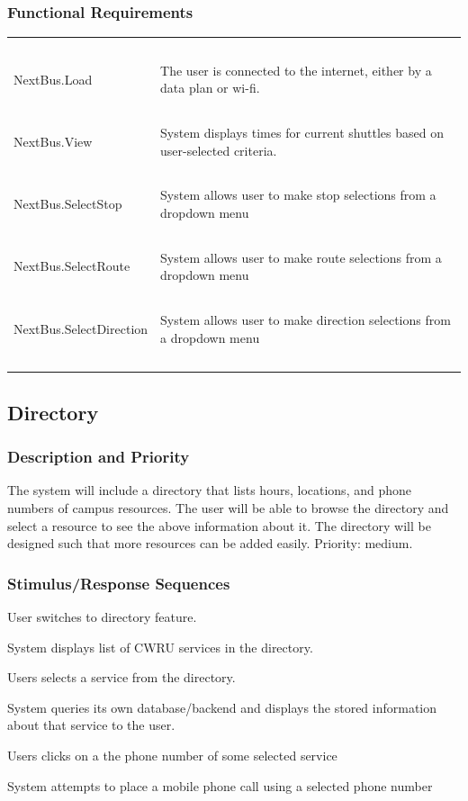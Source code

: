 \documentclass[pdftex,12pt,letter]{article}
\begin{document}
\subsubsection{Functional Requirements}
\begin{table}[!h]
\begin{tabularx}{\textwidth }[t]{|l Y|}
\hline
~&~\\
NextBus.Load &  The user is connected to the internet, either by a data plan or wi-fi.\\
~&~\\
NextBus.View & System displays times for current shuttles based on user-selected criteria.\\
~&~\\
NextBus.SelectStop & System allows user to make stop selections from a dropdown menu \\
~&~\\
NextBus.SelectRoute & System allows user to make route selections from a dropdown menu \\
~&~\\
NextBus.SelectDirection & System allows user to make direction selections from a dropdown menu \\
~&~\\
\hline
\end{tabularx}
\end{table}
\FloatBarrier
\subsection{Directory}
\subsubsection{Description and Priority}
The system will include a directory that lists hours, locations, and phone numbers of campus resources. The user will be able to browse the directory and select a resource to see the above information about it. The directory will be designed such that more resources can be added easily. Priority: medium.
\subsubsection{Stimulus/Response Sequences}
\begin{description}\itemsep1pt
\item[Stimulus:] User switches to directory feature.
\item[Response:] System displays list of CWRU services in the directory.
\item[Stimulus:] Users selects a service from the directory.
\item[Response:] System queries its own database/backend and displays the stored information about that service to the user.
\item[Stimulus:] Users clicks on a the phone number of some selected service
\item[Response:] System attempts to place a mobile phone call using a selected phone number
\end{description}
\end{document}
